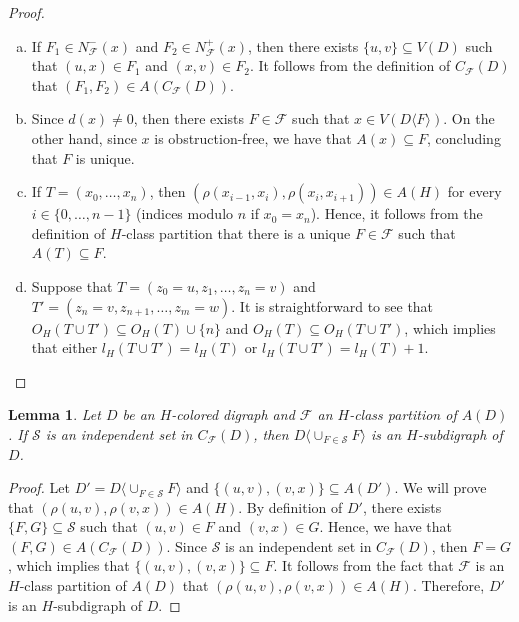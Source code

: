 \documentclass[10pt,a4paper]{article}
\newtheorem{lemma}[theorem]{Lemma}
\begin{document}
\begin{proof}
\begin{enumerate}[a)]
\item If $F_{1} \in N^{-}_{\mathscr{F}}(x)$ and $F_{2} \in N^{+}_{\mathscr{F}}(x)$, then there exists $\{u, v \} \subseteq V(D)$ such that $(u,x) \in F_{1}$ and $(x,v) \in F_{2}$. It follows from the definition of $C_{\mathscr{F}}(D)$ that $(F_{1}, F_{2}) \in A(C_{\mathscr{F}}(D))$.

\item Since $d(x) \neq 0$, then there exists $F \in \mathscr{F}$ such that $x \in V(D\langle F \rangle )$. On the other hand, since $x$ is obstruction-free, we have that $A(x) \subseteq F$, concluding that $F$ is unique.

\item If $T=(x_{0}, \ldots , x_{n})$, then $(\rho (x_{i-1}, x_{i}), \rho (x_{i}, x_{i+1})) \in A(H)$ for every $i \in \{0, \ldots , n-1\}$ (indices modulo $n$ if $x_{0}=x_{n}$). Hence, it follows from the definition of $H$-class partition that there is a unique $F \in \mathscr{F}$ such that $A(T) \subseteq F$.

\item Suppose that $T=(z_{0} = u, z_{1}, \ldots , z_{n}=v)$ and $T'=(z_{n} = v, z_{n+1}, \ldots , z_{m} =w)$. It is straightforward to see that $O_{H}(T \cup T') \subseteq  O_{H}(T) \cup \{ n \}$ and $O_{H}(T) \subseteq O_{H}(T \cup T')$, which implies that either $l_{H}(T \cup T')=l_{H}(T)$ or $l_{H}(T \cup T') = l_{H}(T) +1$.
\end{enumerate}
\end{proof}

\begin{lemma}
\label{c1.l1}
Let $D$ be an $H$-colored digraph and $\mathscr{F}$ an $H$-class partition of $A(D)$. If $\mathcal{S}$ is an independent set in $C_{\mathscr{F}}(D)$, then $D\langle \cup _{F \in  \mathcal{S}} F\rangle$ is an $H$-subdigraph of $D$.
\end{lemma}
\begin{proof}
Let $D'=D\langle \cup _{F \in  \mathcal{S}} F\rangle$ and  $\{ (u,v), (v,x)\} \subseteq A(D')$. We will prove that $ ( \rho (u,v), \rho (v,x)) \in A(H)$. 
By definition of $D'$, there exists $\{ F,G\} \subseteq \mathcal{S}$ such that $(u,v) \in F$ and $(v,x) \in G$. Hence, we have that $(F,G) \in A(C_{\mathscr{F}}(D))$. Since $\mathcal{S}$ is an independent set in $C_{\mathscr{F}}(D)$, then $F=G$, which implies that $\{ (u,v), (v,x) \} \subseteq F$.
It follows from the fact that $\mathscr{F}$ is an $H$-class partition of $A(D)$ that $(\rho (u,v) , \rho (v,x)) \in A(H)$. Therefore, $D'$ is an $H$-subdigraph of $D$.
\end{proof}
\end{document}
